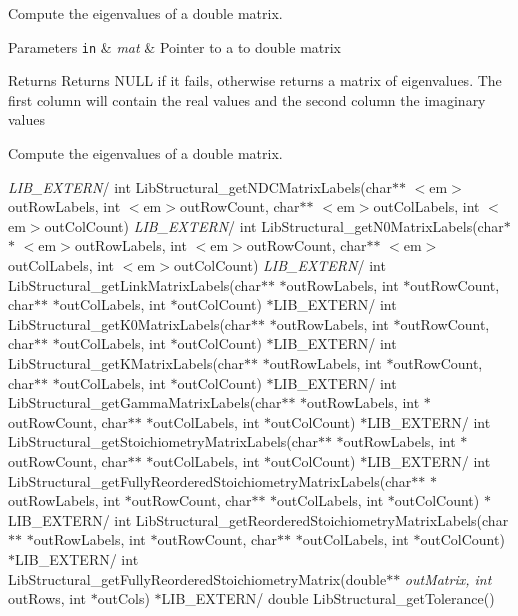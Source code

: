 Compute the eigenvalues of a double matrix. 


\begin{DoxyParams}[1]{Parameters}
\mbox{\tt in}  & {\em mat} & Pointer to a to double matrix \\
\hline
\end{DoxyParams}
\begin{DoxyReturn}{Returns}
Returns N\-U\-L\-L if it fails, otherwise returns a matrix of eigenvalues. The first column will contain the real values and the second column the imaginary values
\end{DoxyReturn}
Compute the eigenvalues of a double matrix.

{\itshape L\-I\-B\-\_\-\-E\-X\-T\-E\-R\-N}/ int Lib\-Structural\-\_\-get\-N\-D\-C\-Matrix\-Labels(char$\ast$$\ast$ $<$em$>$out\-Row\-Labels, int $<$em$>$out\-Row\-Count, char$\ast$$\ast$ $<$em$>$out\-Col\-Labels, int $<$em$>$out\-Col\-Count) {\itshape L\-I\-B\-\_\-\-E\-X\-T\-E\-R\-N}/ int Lib\-Structural\-\_\-get\-N0\-Matrix\-Labels(char$\ast$$\ast$ $<$em$>$out\-Row\-Labels, int $<$em$>$out\-Row\-Count, char$\ast$$\ast$ $<$em$>$out\-Col\-Labels, int $<$em$>$out\-Col\-Count) {\itshape L\-I\-B\-\_\-\-E\-X\-T\-E\-R\-N}/ int Lib\-Structural\-\_\-get\-Link\-Matrix\-Labels(char$\ast$$\ast$ $\ast$out\-Row\-Labels, int $\ast$out\-Row\-Count, char$\ast$$\ast$ $\ast$out\-Col\-Labels, int $\ast$out\-Col\-Count) $\ast$\-L\-I\-B\-\_\-\-E\-X\-T\-E\-R\-N/ int Lib\-Structural\-\_\-get\-K0\-Matrix\-Labels(char$\ast$$\ast$ $\ast$out\-Row\-Labels, int $\ast$out\-Row\-Count, char$\ast$$\ast$ $\ast$out\-Col\-Labels, int $\ast$out\-Col\-Count) $\ast$\-L\-I\-B\-\_\-\-E\-X\-T\-E\-R\-N/ int Lib\-Structural\-\_\-get\-K\-Matrix\-Labels(char$\ast$$\ast$ $\ast$out\-Row\-Labels, int $\ast$out\-Row\-Count, char$\ast$$\ast$ $\ast$out\-Col\-Labels, int $\ast$out\-Col\-Count) $\ast$\-L\-I\-B\-\_\-\-E\-X\-T\-E\-R\-N/ int Lib\-Structural\-\_\-get\-Gamma\-Matrix\-Labels(char$\ast$$\ast$ $\ast$out\-Row\-Labels, int $\ast$out\-Row\-Count, char$\ast$$\ast$ $\ast$out\-Col\-Labels, int $\ast$out\-Col\-Count) $\ast$\-L\-I\-B\-\_\-\-E\-X\-T\-E\-R\-N/ int Lib\-Structural\-\_\-get\-Stoichiometry\-Matrix\-Labels(char$\ast$$\ast$ $\ast$out\-Row\-Labels, int $\ast$out\-Row\-Count, char$\ast$$\ast$ $\ast$out\-Col\-Labels, int $\ast$out\-Col\-Count) $\ast$\-L\-I\-B\-\_\-\-E\-X\-T\-E\-R\-N/ int Lib\-Structural\-\_\-get\-Fully\-Reordered\-Stoichiometry\-Matrix\-Labels(char$\ast$$\ast$ $\ast$out\-Row\-Labels, int $\ast$out\-Row\-Count, char$\ast$$\ast$ $\ast$out\-Col\-Labels, int $\ast$out\-Col\-Count) $\ast$\-L\-I\-B\-\_\-\-E\-X\-T\-E\-R\-N/ int Lib\-Structural\-\_\-get\-Reordered\-Stoichiometry\-Matrix\-Labels(char$\ast$$\ast$ $\ast$out\-Row\-Labels, int $\ast$out\-Row\-Count, char$\ast$$\ast$ $\ast$out\-Col\-Labels, int $\ast$out\-Col\-Count) $\ast$\-L\-I\-B\-\_\-\-E\-X\-T\-E\-R\-N/ int Lib\-Structural\-\_\-get\-Fully\-Reordered\-Stoichiometry\-Matrix(double$\ast$$\ast$ {\itshape out\-Matrix, int} out\-Rows, int $\ast$out\-Cols) $\ast$\-L\-I\-B\-\_\-\-E\-X\-T\-E\-R\-N/ double Lib\-Structural\-\_\-get\-Tolerance() \hypertarget{group___linear_algebra_ga6e051938ef3fc78acb122016b119b8f4}{
}$$
